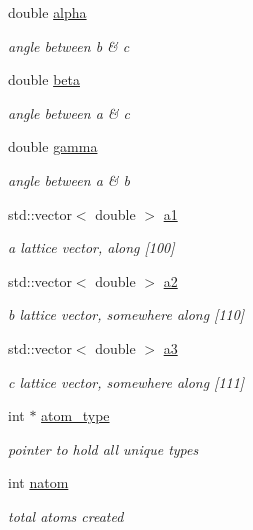\begin{DoxyCompactItemize}
double \hyperlink{class_l_a_t_t_i_c_e_af8ceb04d3e61325053e42df2c797064d}{alpha}
\begin{DoxyCompactList}\small\item\em angle between {\ttfamily b \& c} \end{DoxyCompactList}\item 
double \hyperlink{class_l_a_t_t_i_c_e_ad16b52e37b1f6f92598aec8940503bf3}{beta}
\begin{DoxyCompactList}\small\item\em angle between {\ttfamily a \& c} \end{DoxyCompactList}\item 
double \hyperlink{class_l_a_t_t_i_c_e_a5a4c56af589d9fa6639025ef72e8fac2}{gamma}
\begin{DoxyCompactList}\small\item\em angle between {\ttfamily a \& b} \end{DoxyCompactList}\item 
std\+::vector$<$ double $>$ \hyperlink{class_l_a_t_t_i_c_e_a9a56f2f8e797ae6a496527f1ba937769}{a1}
\begin{DoxyCompactList}\small\item\em a lattice vector, along \mbox{[}100\mbox{]} \end{DoxyCompactList}\item 
std\+::vector$<$ double $>$ \hyperlink{class_l_a_t_t_i_c_e_a7f6dbfc6795b67a0d92b156789bb8977}{a2}
\begin{DoxyCompactList}\small\item\em b lattice vector, somewhere along \mbox{[}110\mbox{]} \end{DoxyCompactList}\item 
std\+::vector$<$ double $>$ \hyperlink{class_l_a_t_t_i_c_e_a5f5355169d092e243480783bde501ccd}{a3}
\begin{DoxyCompactList}\small\item\em c lattice vector, somewhere along \mbox{[}111\mbox{]} \end{DoxyCompactList}\item 
int $\ast$ \hyperlink{class_l_a_t_t_i_c_e_a8eb1ea5b25b8678b136c5e663d4aeb0e}{atom\+\_\+type}
\begin{DoxyCompactList}\small\item\em pointer to hold all unique types \end{DoxyCompactList}\item 
int \hyperlink{class_l_a_t_t_i_c_e_a9efda355b82d0fcbc013b1fdf17bb758}{natom}
\begin{DoxyCompactList}\small\item\em total atoms created \end{DoxyCompactList}\item 

\end{DoxyCompactItemize}
